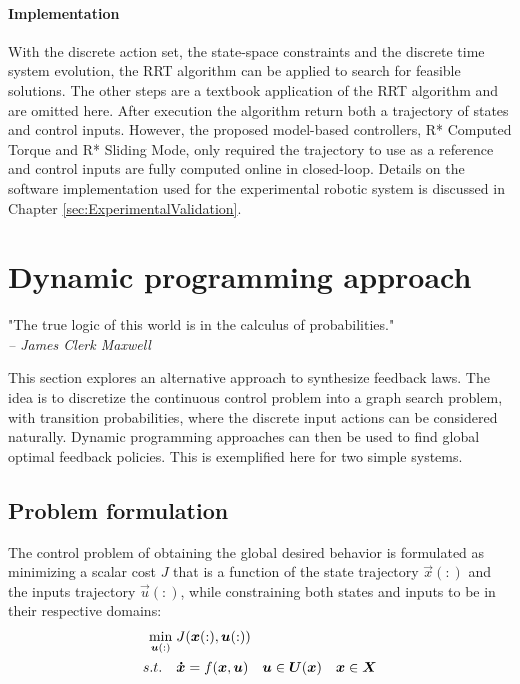\paragraph{Implementation}
%
With the discrete action set, the state-space constraints and the discrete time system evolution, the RRT algorithm can be applied to search for feasible solutions. The other steps are a textbook application of the RRT algorithm \cite{lavalle_planning_2006} and are omitted here.  After execution the algorithm return both a trajectory of states and control inputs. However, the proposed model-based controllers, R* Computed Torque and R* Sliding Mode, only required the trajectory to use as a reference and control inputs are fully computed online in closed-loop. Details on the software implementation used for the experimental robotic system is discussed in Chapter \ref{sec:ExperimentalValidation}.



\newpage

\section{Dynamic programming approach}
\label{sec:DynamicProgrammingAproach}

\begin{flushright}
\small"The true logic of this world is in the calculus of probabilities." \\ \emph{-- James Clerk Maxwell}
\end{flushright}

This section explores an alternative approach to synthesize feedback laws. The idea is to discretize the continuous control problem into a graph search problem, with transition probabilities, where the discrete input actions can be considered naturally. Dynamic programming approaches can then be used to find global optimal feedback policies. This is exemplified here for two simple systems.

\subsection{Problem formulation}

The control problem of obtaining the global desired behavior is formulated as minimizing a scalar cost $J$ that is a function of the state trajectory $\vec{x}(:)$ and the inputs trajectory $\vec{u}(:)$, while constraining both states and inputs to be in their respective domains:
\begin{align}
	\operatornamewithlimits{min}\limits_{\vec{u}(:)} \; & J(\vec{x}(:),\vec{u}(:)) \\
	s.t. \quad & \vec{\dot{x}} = f(\vec{x}, \vec{u}) \quad \vec{u} \in \boldsymbol{U}(\vec{x}) \quad \vec{x} \in \boldsymbol{X}
	\label{eq:min}
\end{align}

